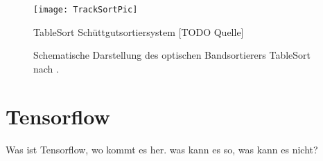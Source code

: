 \begin{figure}
	\texttt{[image: TrackSortPic]}
	\caption{TableSort Schüttgutsortiersystem [TODO Quelle]}
	\label{fig:tablesortsystem}
\end{figure}




\begin{figure}
    \centering
    \def\svgwidth{\columnwidth}
	
	\label{fig:aufbau_tablesort}
	\caption{Schematische Darstellung des optischen Bandsortierers TableSort nach \cite{Pfaff2017}.}
\end{figure}

% 	

\section{Tensorflow}

Was ist Tensorflow, wo kommt es her. was kann es so, was kann es nicht?